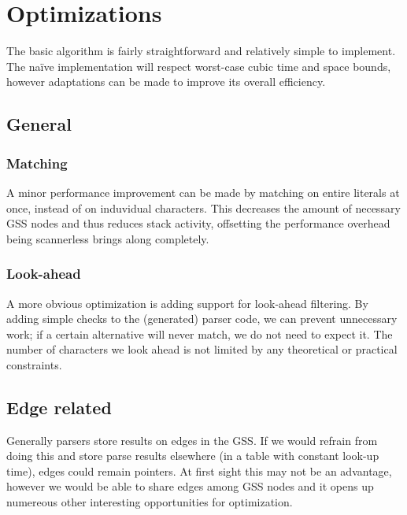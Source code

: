 \documentclass[a4paper,10pt]{article}
\begin{document}
\section{Optimizations}
\label{chap:optimizations}

The basic algorithm is fairly straightforward and relatively simple to implement. The naïve implementation will respect worst-case cubic time and space bounds, however adaptations can be made to improve its overall efficiency.

\subsection{General}

\subsubsection{Matching}
A minor performance improvement can be made by matching on entire literals at once, instead of on induvidual characters. This decreases the amount of necessary GSS nodes and thus reduces stack activity, offsetting the performance overhead being scannerless brings along completely.

\subsubsection{Look-ahead}
A more obvious optimization is adding support for look-ahead filtering. By adding simple checks to the (generated) parser code, we can prevent unnecessary work; if a certain alternative will never match, we do not need to expect it. The number of characters we look ahead is not limited by any theoretical or practical constraints.

\subsection{Edge related}
\label{sec:edgeOptimizations}

Generally parsers store results on edges in the GSS. If we would refrain from doing this and store parse results elsewhere (in a table with constant look-up time), edges could remain pointers. At first sight this may not be an advantage, however we would be able to share edges among GSS nodes and it opens up numereous other interesting opportunities for optimization.
\end{document}
